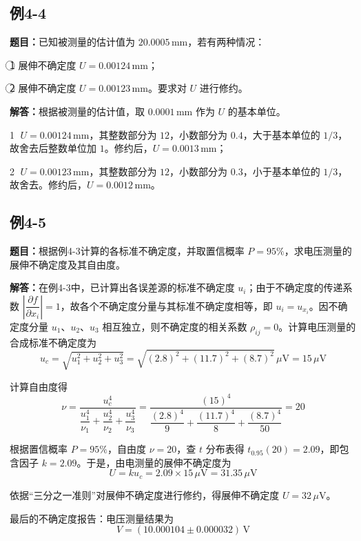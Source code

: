 \documentclass[UTF8,zihao=-4]{ctexart}
\newcommand{\problem}[1]{\subsection*{#1}}
\newcommand{\timu}{\noindent\textbf{题目：}}
\newcommand{\jieda}{\noindent\textbf{解答：}}
\begin{document}
\problem{例4-4}

\timu 已知被测量的估计值为 $20.0005\,\mathrm{mm}$，若有两种情况：

\textcircled{1} 展伸不确定度 $U=0.00124\,\mathrm{mm}$；

\textcircled{2} 展伸不确定度 $U=0.00123\,\mathrm{mm}$。要求对 $U$ 进行修约。

\jieda 根据被测量的估计值，取 $0.0001\,\mathrm{mm}$ 作为 $U$ 的基本单位。

\textcircled{1} $U=0.00124\,\mathrm{mm}$，其整数部分为 $12$，小数部分为 $0.4$，大于基本单位的 $1/3$，故舍去后整数单位加 $1$。修约后，$U=0.0013\,\mathrm{mm}$；

\textcircled{2} $U=0.00123\,\mathrm{mm}$，其整数部分为 $12$，小数部分为 $0.3$，小于基本单位的 $1/3$，故舍去。修约后，$U=0.0012\,\mathrm{mm}$。

\problem{例4-5}

\timu 根据例4-3计算的各标准不确定度，并取置信概率 $P=95\%$，求电压测量的展伸不确定度及其自由度。

\jieda 在例4-3中，已计算出各误差源的标准不确定度 $u_i$；由于不确定度的传递系数 $\left|\dfrac{\partial f}{\partial x_i}\right|=1$，故各个不确定度分量与其标准不确定度相等，即 $u_i=u_{x_i}$。因不确定度分量 $u_1$、$u_2$、$u_3$ 相互独立，则不确定度的相关系数 $\rho_{ij}=0$。计算电压测量的合成标准不确定度为
\begin{equation*}
    u_c
    =
    \sqrt{u_1^2+u_2^2+u_3^2}
    =
    \sqrt{(2.8)^2+(11.7)^2+(8.7)^2}\,\mu\mathrm{V}
    =
    15\,\mu\mathrm{V}
\end{equation*}

计算自由度得
\begin{equation*}
    \nu
    =
    \frac{u_c^4}
    {
    \dfrac{u_1^4}{\nu_1}
    +
    \dfrac{u_2^4}{\nu_2}
    +
    \dfrac{u_3^4}{\nu_3}
    }
    =
    \frac{(15)^4}
    {
    \dfrac{(2.8)^4}{9}
    +
    \dfrac{(11.7)^4}{8}
    +
    \dfrac{(8.7)^4}{50}
    }
    =
    20
\end{equation*}

根据置信概率 $P=95\%$，自由度 $\nu=20$，查 $t$ 分布表得 $t_{0.95}(20)=2.09$，即包含因子 $k=2.09$。于是，由电测量的展伸不确定度为
\begin{equation*}
    U
    =
    ku_c
    =
    2.09\times15\,\mu\mathrm{V}
    =
    31.35\,\mu\mathrm{V}
\end{equation*}

依据“三分之一准则”对展伸不确定度进行修约，得展伸不确定度 $U=32\,\mu\mathrm{V}$。

最后的不确定度报告：电压测量结果为
\begin{equation*}
    V=(10.000104\pm0.000032)\,\mathrm{V}
\end{equation*}
\end{document}

